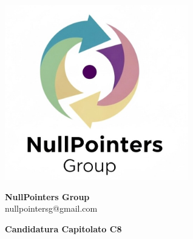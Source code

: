 \documentclass{article}
\begin{document}
	\pagestyle{empty}
	\begin{minipage}{0.4\textwidth}
		\includegraphics[width=0.6\textwidth]{logo_gruppo}
	\end{minipage}
	\begin{minipage}{0.55\textwidth}
		\textbf{NullPointers Group} \\
		\textsf{nullpointersg@gmail.com}
	\end{minipage}
	
	\vspace{2cm}
	
	{
		\centering
		\Huge\bfseries Candidatura Capitolato C8\par
		\vspace{0.5cm}
	}
	
\end{document}

